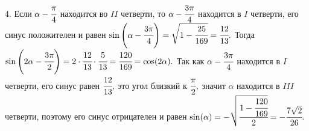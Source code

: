 4. Если $\alpha-\cfrac{\pi}{4}$ находится во $II$ четверти, то $\alpha-\cfrac{3\pi}{4}$ находится в $I$ четверти, его синус положителен и равен $\sin\left(\alpha-\cfrac{3\pi}{4}\right)=\sqrt{1-\cfrac{25}{169}}=\cfrac{12}{13}.$ Тогда $\sin\left(2\alpha-\cfrac{3\pi}{2}\right)=2\cdot\cfrac{12}{13}\cdot
\cfrac{5}{13}=\cfrac{120}{169}=\cos(2\alpha).$ Так как $\alpha-\cfrac{3\pi}{4}$ находится в $I$ четверти, его синус равен $\cfrac{12}{13},$ это угол близкий
к $\cfrac{\pi}{2},$ значит $\alpha$ находится в $III$ четверти, поэтому его синус отрицателен и равен $\sin(\alpha)=-\sqrt{\cfrac{1-\cfrac{120}{169}}{2}}=-\cfrac{7\sqrt{2}}{26}.$\\
